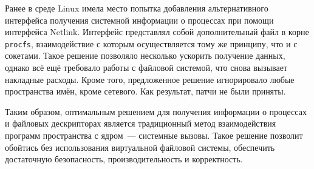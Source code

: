 Ранее в среде Linux имела место попытка добавления альтернативного интерфейса
получения системной информации о процессах при помощи интерфейса
Netlink\cite{vagin}. Интерфейс представлял собой дополнительный файл в корне
\texttt{procfs}, взаимодействие с которым осуществляется тому же принципу, что и
с сокетами. Такое решение позволяло несколько ускорить получение данных, однако
всё ещё требовало работы с файловой системой, что снова вызывает накладные
расходы. Кроме того, предложенное решение игнорировало любые пространства имён,
кроме сетевого. Как результат, патчи не были приняты.

Таким образом, оптимальным решением для получения информации о процессах и
файловых дескрипторах является традиционный метод взаимодействия программ
пространства с ядром~--- системные вызовы\cite{man_syscall}. Такое решение
позволит обойтись без использования виртуальной файловой системы, обеспечить
достаточную безопасность, производительность и корректность.

\nocite{tanenbaum, lkml}
